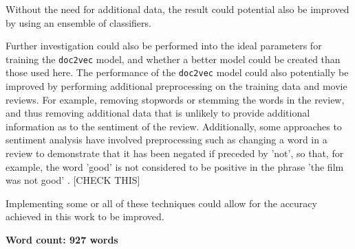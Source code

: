 \documentclass[twocolumn]{article}
\begin{document}
Without the need for additional data, the result could potential also be improved by using an ensemble of classifiers.

Further investigation could also be performed into the ideal parameters for training the \texttt{doc2vec} model, and whether a better model could be created than those used here. The performance of the \texttt{doc2vec} model could also potentially be improved by performing additional preprocessing on the training data and movie reviews. For example, removing stopwords or stemming the words in the review, and thus removing additional data that is unlikely to provide additional information as to the sentiment of the review. Additionally, some approaches to sentiment analysis have involved preprocessing such as changing a word in a review to demonstrate that it has been negated if preceded by 'not', so that, for example, the word 'good' is not considered to be positive in the phrase 'the film was not good' \cite{pang}. [CHECK THIS]

Implementing some or all of these techniques could allow for the accuracy achieved in this work to be improved.


\textbf{Word count: 927 words}

{}

\end{document}
